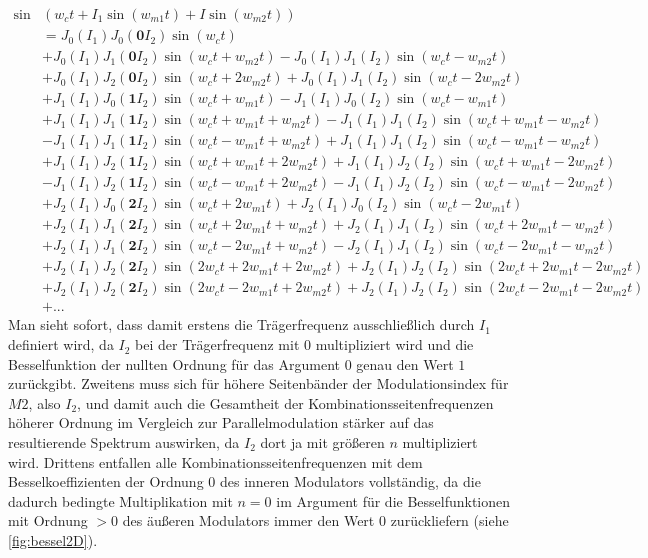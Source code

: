 \begin{equation}
\begin{split}
\sin&(w_ct + I_1\sin(w_{m1}t) + I\sin(w_{m2}t)) \\
&= J_0(I_1)J_0(\mathbf{0}I_2)\sin(w_ct) \\
&+ J_0(I_1)J_1(\mathbf{0}I_2)\sin(w_ct + w_{m2}t) - J_0(I_1)J_1(I_2)\sin(w_ct - w_{m2}t) \\
&+ J_0(I_1)J_2(\mathbf{0}I_2)\sin(w_ct + 2w_{m2}t) + J_0(I_1)J_1(I_2)\sin(w_ct - 2w_{m2}t) \\
&+ J_1(I_1)J_0(\mathbf{1}I_2)\sin(w_ct + w_{m1}t) - J_1(I_1)J_0(I_2)\sin(w_ct - w_{m1}t) \\
&+ J_1(I_1)J_1(\mathbf{1}I_2)\sin(w_ct + w_{m1}t + w_{m2}t) - J_1(I_1)J_1(I_2)\sin(w_ct + w_{m1}t - w_{m2}t) \\
&- J_1(I_1)J_1(\mathbf{1}I_2)\sin(w_ct - w_{m1}t + w_{m2}t) + J_1(I_1)J_1(I_2)\sin(w_ct - w_{m1}t - w_{m2}t) \\
&+ J_1(I_1)J_2(\mathbf{1}I_2)\sin(w_ct + w_{m1}t + 2w_{m2}t) + J_1(I_1)J_2(I_2)\sin(w_ct + w_{m1}t - 2w_{m2}t) \\
&- J_1(I_1)J_2(\mathbf{1}I_2)\sin(w_ct - w_{m1}t + 2w_{m2}t) - J_1(I_1)J_2(I_2)\sin(w_ct - w_{m1}t - 2w_{m2}t) \\
&+ J_2(I_1)J_0(\mathbf{2}I_2)\sin(w_ct + 2w_{m1}t) + J_2(I_1)J_0(I_2)\sin(w_ct - 2w_{m1}t) \\
&+ J_2(I_1)J_1(\mathbf{2}I_2)\sin(w_ct + 2w_{m1}t + w_{m2}t) + J_2(I_1)J_1(I_2)\sin(w_ct + 2w_{m1}t - w_{m2}t) \\
&+ J_2(I_1)J_1(\mathbf{2}I_2)\sin(w_ct - 2w_{m1}t + w_{m2}t) - J_2(I_1)J_1(I_2)\sin(w_ct - 2w_{m1}t - w_{m2}t) \\
&+ J_2(I_1)J_2(\mathbf{2}I_2)\sin(2w_ct + 2w_{m1}t + 2w_{m2}t) + J_2(I_1)J_2(I_2)\sin(2w_ct + 2w_{m1}t - 2w_{m2}t) \\
&+ J_2(I_1)J_2(\mathbf{2}I_2)\sin(2w_ct - 2w_{m1}t + 2w_{m2}t) + J_2(I_1)J_2(I_2)\sin(2w_ct - 2w_{m1}t - 2w_{m2}t) \\
&+ ... 
\end{split}
\end{equation}
\label{Kaskadenspecials}
Man sieht sofort, dass damit erstens die Trägerfrequenz ausschließlich durch $ I_1 $ definiert wird, da $ I_2 $ bei der Trägerfrequenz mit $0$ multipliziert wird und die Besselfunktion der nullten Ordnung für das Argument $0$ genau den Wert $1$ zurückgibt. Zweitens muss sich für höhere Seitenbänder der Modulationsindex für $M2$, also $ I_2 $, und damit auch die Gesamtheit der Kombinationsseitenfrequenzen höherer Ordnung im Vergleich zur Parallelmodulation stärker auf das resultierende Spektrum auswirken, da $ I_2 $ dort ja mit größeren $n$ multipliziert wird. Drittens entfallen alle Kombinationsseitenfrequenzen mit dem Besselkoeffizienten der Ordnung $0$ des inneren Modulators vollständig, da die dadurch bedingte Multiplikation mit $n = 0$ im Argument für die Besselfunktionen mit Ordnung $>0$ des äußeren Modulators immer den Wert $0$ zurückliefern (siehe \ref{fig:bessel2D}). 

